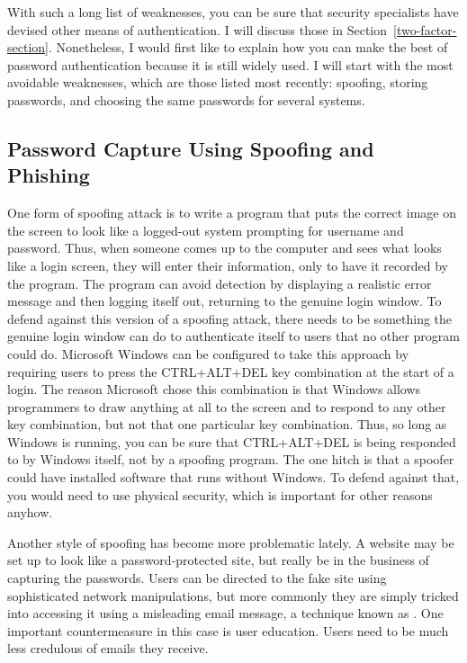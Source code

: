 With such a long list of weaknesses, you can be sure that security
specialists have devised other means of authentication.  I will
discuss those in Section~\ref{two-factor-section}.  Nonetheless, I would first like to explain how you can make the best of password
authentication because it is still widely used.  I will start with the most avoidable weaknesses, which are
those listed most recently: spoofing, storing passwords, and choosing the
same passwords for several systems.

\subsection{Password Capture Using Spoofing and Phishing}

One form of spoofing attack is to write a program that puts the correct
image on the screen to look like a logged-out system prompting for
username and password.  Thus, when someone comes up to the computer
and sees what looks like a login screen, they will enter their
information, only to have it recorded by the program.  The program can
avoid detection by displaying a realistic error message and then
logging itself out, returning to the genuine login window.  To defend
against this version of a spoofing attack, there needs to be something
the genuine login window can do to authenticate itself to users that
no other program could do.  Microsoft Windows can be configured to
take this approach by requiring users to press the CTRL+ALT+DEL
key combination at the start of a login.  The reason Microsoft chose
this combination
is that Windows allows programmers to draw anything at all to the
screen and to respond to any other key combination, but not
that one particular key combination.  Thus, so long as Windows
is running, you can be sure that CTRL+ALT+DEL is being responded
to by Windows itself, not by a spoofing program.  The one hitch is that a
spoofer could have installed software that runs without Windows.  To defend
against that, you would need to use physical security, which is
important for other reasons anyhow.

Another style of spoofing has become more problematic lately.  A
website may be set up to look like a password-protected site, but really
be in the business of capturing the passwords.  Users can be directed
to the fake site using sophisticated network manipulations, but more
commonly they are simply tricked into accessing it using a misleading
email message, a technique known as .  One important
countermeasure in this case is user education.  Users need to be much
less credulous of emails they receive.


